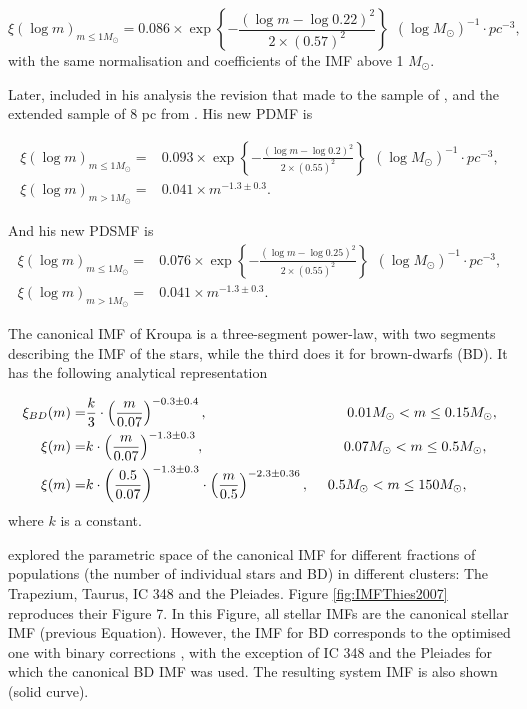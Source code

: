 \begin{equation}
\xi(\log m)_{m\leq1M_{\odot}}=0.086\times \exp{\left\{-\frac{(\log m - \log 0.22)^2}{2 \times (0.57)^2}\right\}}\ \ (\log M_{\odot})^{-1}\cdot pc^{-3},
\end{equation}
with the same normalisation and coefficients of the IMF above 1 $M_{\odot}$.

Later, \citet{Chabrier2005} included in his analysis the revision that \citet{2002AJ....124.2721R} made to the sample of \citep{1986AJ.....91..621D}, and the extended sample of 8 pc from \citet{2004AJ....128..463R}. His new PDMF is

 \begin{align}
\xi(\log m)_{m\leq1M_{\odot}}=&0.093\times \exp{\left\{-\frac{(\log m - \log 0.2)^2}{2 \times (0.55)^2}\right\}}\ \ (\log M_{\odot})^{-1}\cdot pc^{-3},\\
\xi(\log m)_{m>1M_{\odot}}=& 0.041\times m^{-1.3\pm0.3}.
\end{align}

And his new PDSMF is
 \begin{align}
\xi(\log m)_{m\leq1M_{\odot}}=&0.076\times \exp{\left\{-\frac{(\log m - \log 0.25)^2}{2 \times (0.55)^2}\right\}}\ \ (\log M_{\odot})^{-1}\cdot pc^{-3},\\
\xi(\log m)_{m>1M_{\odot}}=& 0.041\times m^{-1.3\pm0.3}.
\end{align}

The canonical IMF of Kroupa \citep{2013pss5.book..115K} is a three-segment power-law, with two segments describing the IMF of the stars, while the third does it for brown-dwarfs (BD). It has the following analytical representation

\begin{align}
\xi_{BD}(m)=&\frac{k}{3}\cdot\left(\frac{m}{0.07}\right)^{-0.3\pm0.4}, \hspace{3.5cm} 0.01M_{\odot} < m \leq 0.15 M_{\odot},\\
\xi(m)=& k\cdot \left(\frac{m}{0.07}\right)^{-1.3\pm0.3}, \hspace{3.5cm} 0.07M_{\odot} < m \leq 0.5 M_{\odot},\\
\xi(m)=& k\cdot \left(\frac{0.5}{0.07}\right)^{-1.3\pm0.3}\cdot  \left(\frac{m}{0.5}\right)^{-2.3\pm0.36}, \ \ \ \ 0.5 M_{\odot} < m \leq 150 M_{\odot},
\end{align}
where $k$ is a constant.
 
 \citet{Thies2007} explored the parametric space of the canonical IMF for different fractions of populations (the number of individual stars and BD) in different clusters: The Trapezium, Taurus, IC 348 and the Pleiades. Figure \ref{fig:IMFThies2007} reproduces their Figure 7. In this Figure, all stellar IMFs are the canonical stellar IMF (previous Equation). However, the IMF for BD corresponds to the optimised one with binary corrections \cite[see][for details]{Thies2007}, with the exception of IC 348 and the Pleiades for which the canonical BD IMF was used. The resulting system IMF is also shown (solid curve).
 
